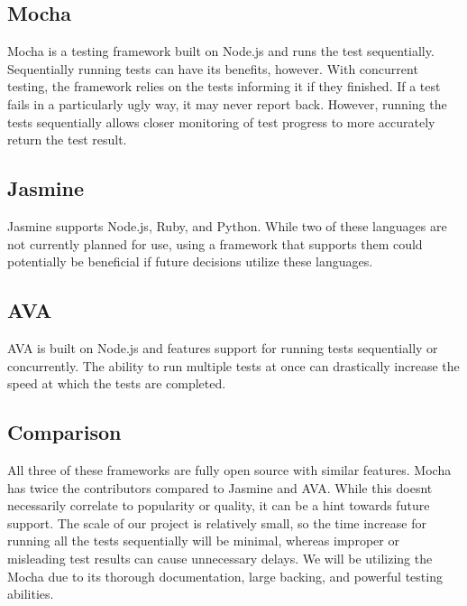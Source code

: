 \documentclass[letterpaper,10pt,onecolumn]{IEEEtran}
\begin{document}
  \subsection {Mocha}
    Mocha is a testing framework built on Node.js and runs the test sequentially. Sequentially running tests can have its benefits, however. With concurrent testing, the framework relies on the tests informing it if they finished. If a test fails in a particularly ugly way, it may never report back. However, running the tests sequentially allows closer monitoring of test progress to more accurately return the test result. \cite{mocha}
  \subsection {Jasmine}
    Jasmine supports Node.js, Ruby, and Python. While two of these languages are not currently planned for use, using a framework that supports them could potentially be beneficial if future decisions utilize these languages. \cite{jasmine}
  \subsection {AVA}
    AVA is built on Node.js and features support for running tests sequentially or concurrently. The ability to run multiple tests at once can drastically increase the speed at which the tests are completed. \cite{ava}
  \subsection {Comparison}
    All three of these frameworks are fully open source with similar features. Mocha has twice the contributors compared to Jasmine and AVA. While this doesn\textsc{}t necessarily correlate to popularity or quality, it can be a hint towards future support. The scale of our project is relatively small, so the time increase for running all the tests sequentially will be minimal, whereas improper or misleading test results can cause unnecessary delays. We will be utilizing the Mocha due to its thorough documentation, large backing, and powerful testing abilities. \cite{MvJ}

    \clearpage
    {}
    
\end{document}
